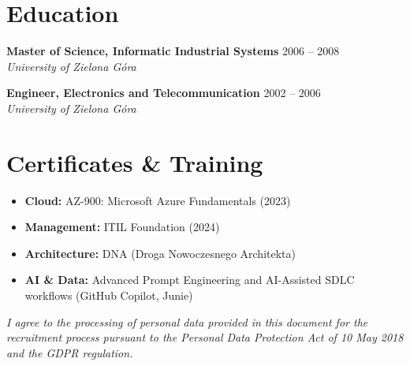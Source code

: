 \documentclass[11pt,a4paper]{article}
\begin{document}
	\section{Education}
	\noindent
	\textbf{Master of Science, Informatic Industrial Systems} \hfill 2006 -- 2008 \\
	\textit{University of Zielona Góra}
	
	\vspace{4pt}
	\noindent
	\textbf{Engineer, Electronics and Telecommunication} \hfill 2002 -- 2006 \\
	\textit{University of Zielona Góra}
	
	\section{Certificates \& Training}
	\begin{itemize}[leftmargin=*, noitemsep, topsep=0pt]
		\item \textbf{Cloud:} AZ-900: Microsoft Azure Fundamentals (2023)
		\item \textbf{Management:} ITIL Foundation (2024)
		\item \textbf{Architecture:} DNA (Droga Nowoczesnego Architekta)
		\item \textbf{AI \& Data:} Advanced Prompt Engineering and AI-Assisted SDLC workflows (GitHub Copilot, Junie)
	\end{itemize}
	
	\vspace{16pt}
	\noindent
	\footnotesize{\textit{I agree to the processing of personal data provided in this document for the recruitment process pursuant to the Personal Data Protection Act of 10 May 2018 and the GDPR regulation.}}
	
\end{document}
